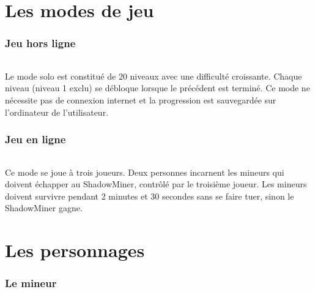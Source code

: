 \documentclass[titlepage, 11px, a4paper]{report}
\begin{document}

\newpage


\part{Les modes de jeu} 

\section{Jeu hors ligne}
\paragraph*{} \hspace{0pt}
Le mode solo est constitué de 20 niveaux avec une difficulté croissante. 
Chaque niveau (niveau 1 exclu) se débloque lorsque le précédent est terminé. 
Ce mode ne nécessite pas de connexion internet et la progression est sauvegardée sur l'ordinateur de l'utilisateur. \\

\section{Jeu en ligne} 
\paragraph*{} \hspace{0pt}
Ce mode se joue à trois joueurs. Deux personnes incarnent les mineurs qui doivent échapper au ShadowMiner, 
contrôlé par le troisième joueur. Les mineurs doivent survivre pendant 2 minutes et 30 secondes 
sans se faire tuer, sinon le ShadowMiner gagne. \\


\newpage


\part{Les personnages} 

\section{Le mineur}
\end{document}
